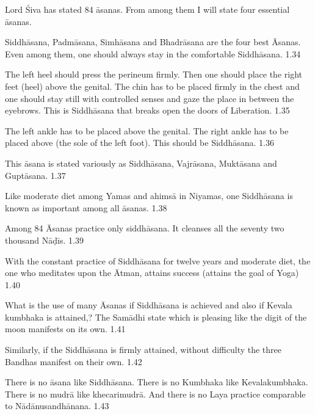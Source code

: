 
Lord Śiva has stated 84 āsanas. From among them I will state four essential āsanas.


Siddhāsana, Padmāsana, Simhāsana and Bhadrāsana are the four best Āsanas. Even among them, one should always stay in the comfortable Siddhāsana.  1.34


The left heel should press the perineum firmly. Then one should place the right feet (heel) above the genital.  The chin has to be placed firmly in the chest and one should stay still with controlled senses and gaze the place in between the eyebrows. This is Siddhāsana that breaks open the doors of Liberation.  1.35


The left ankle has to be placed above the genital. The right ankle has to be placed above (the sole of the left foot). This should be Siddhāsana. 1.36


This āsana is stated variously as Siddhāsana, Vajrāsana, Muktāsana and Guptāsana. 1.37


Like moderate diet  among Yamas and ahimsā in Niyamas, one Siddhāsana is known as important among all āsanas.  1.38

Among 84 Āsanas practice only siddhāsana. It cleanses all the seventy two thousand Nāḍīs.  1.39

With the constant practice of Siddhāsana for twelve years and moderate diet, the one who meditates upon the Ātman,  attains success (attains the goal of Yoga) 1.40

What is the use of many Āsanas if Siddhāsana is achieved and also if Kevala kumbhaka is attained,? The Samādhi state which is pleasing like the digit of the moon manifests on its own. 1.41

Similarly, if the Siddhāsana is firmly attained, without difficulty the three Bandhas manifest on their own.   1.42

There is no āsana like Siddhāsana. There is no Kumbhaka like Kevalakumbhaka. There is no mudrā like khecarimudrā. And there is no Laya practice comparable to Nādānusandhānana. 1.43
\medskip


